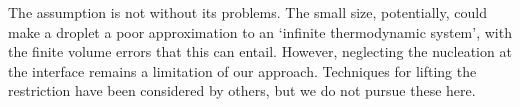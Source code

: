 The assumption is not without its problems.
The small size, potentially, could  make a droplet a poor approximation to an `infinite thermodynamic system',
with the finite volume errors that this can entail.
However, neglecting the nucleation at the interface remains a limitation of our approach.
Techniques for lifting the restriction have been considered by others\cite{Jarvis1975, Katz1992},
but we do not pursue these here.





